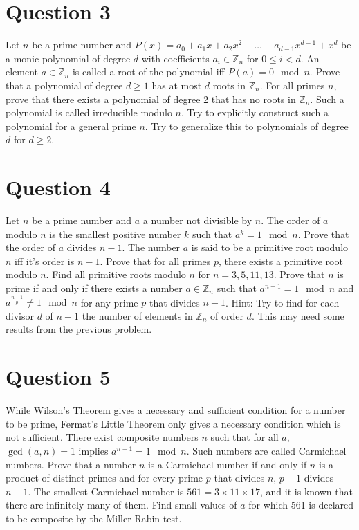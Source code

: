 \documentclass[12pt]{report}
\begin{document}
\section*{Question 3}
Let $n$ be a prime number and $P(x) = a_{0} + a_{1}x + a_{2}x^2 + \dots + a_{d - 1}x^{d - 1} + x^{d}$ be a monic polynomial of degree $d$ with coefficients $a_{i} \in \mathbb{Z}_{n}$ for $0 \leq i < d$. An element $a \in \mathbb{Z}_{n}$ is called a root of the polynomial iff $P(a) = 0 \mod n$. Prove that a polynomial of degree $d \geq 1$ has at most $d$ roots in $\mathbb{Z}_{n}$. For all primes $n$, prove that there exists a polynomial of degree 2 that has no roots in $\mathbb{Z}_{n}$. Such a polynomial is called irreducible modulo $n$. Try to explicitly construct such a polynomial for a general prime $n$. Try to generalize this to polynomials of degree $d$ for $d \geq 2$.
\section*{Question 4}
Let $n$ be a prime number and $a$ a number not divisible by $n$. The order of $a$ modulo $n$ is the smallest positive number $k$ such that $a^{k} = 1 \mod n$. Prove that the order of $a$ divides $n - 1$. The number $a$ is said to be a primitive root modulo $n$ iff it's order is $n - 1$. Prove that for all primes $p$, there exists a primitive root modulo $n$. Find all primitive roots modulo $n$ for $n = 3, 5, 11, 13$. Prove that $n$ is prime if and only if there exists a number $a \in \mathbb{Z}_{n}$ such that $a^{n - 1} = 1 \mod n$ and $a^{\frac{n - 1}{p}} \neq 1 \mod n$ for any prime $p$ that divides $n - 1$. Hint: Try to find for each divisor $d$ of $n - 1$ the number of elements in $\mathbb{Z}_{n}$ of order $d$. This may need some results from the previous problem.
\section*{Question 5}
While Wilson's Theorem gives a necessary and sufficient condition for a number to be prime, Fermat's Little Theorem only gives a necessary condition which is not sufficient. There exist composite numbers $n$ such that for all $a$, $\gcd(a, n) = 1$ implies $a^{n - 1} = 1 \mod n$. Such numbers are called Carmichael numbers. Prove that a number $n$ is a Carmichael number if and only if $n$ is a product of distinct primes and for every prime $p$ that divides $n$, $p - 1$ divides $n - 1$. The smallest Carmichael number is $561 = 3 \times 11 \times 17$, and it is known that there are infinitely many of them. Find small values of $a$ for which 561 is declared to be composite by the Miller-Rabin test.
\end{document}
